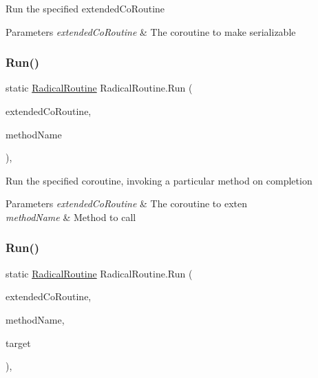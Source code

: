 Run the specified extended\+Co\+Routine 


\begin{DoxyParams}{Parameters}
{\em extended\+Co\+Routine} & The coroutine to make serializable \\
\hline
\end{DoxyParams}
\mbox{\label{class_radical_routine_ac64373a158f06b92f5d1c0052a49c3b6}} 
\subsubsection{\texorpdfstring{Run()}{Run()}\hspace{0.1cm}{\footnotesize\ttfamily [2/6]}}
{\footnotesize\ttfamily static \hyperlink{class_radical_routine}{Radical\+Routine} Radical\+Routine.\+Run (\begin{DoxyParamCaption}\item[{I\+Enumerator}]{extended\+Co\+Routine,  }\item[{string}]{method\+Name }\end{DoxyParamCaption})\hspace{0.3cm}{\ttfamily [inline]}, {\ttfamily [static]}}



Run the specified coroutine, invoking a particular method on completion 


\begin{DoxyParams}{Parameters}
{\em extended\+Co\+Routine} & The coroutine to exten \\
\hline
{\em method\+Name} & Method to call \\
\hline
\end{DoxyParams}
\mbox{\label{class_radical_routine_a569f25f7a79cec6bee8998d2927e1de2}} 
\subsubsection{\texorpdfstring{Run()}{Run()}\hspace{0.1cm}{\footnotesize\ttfamily [3/6]}}
{\footnotesize\ttfamily static \hyperlink{class_radical_routine}{Radical\+Routine} Radical\+Routine.\+Run (\begin{DoxyParamCaption}\item[{I\+Enumerator}]{extended\+Co\+Routine,  }\item[{string}]{method\+Name,  }\item[{object}]{target }\end{DoxyParamCaption})\hspace{0.3cm}{\ttfamily [inline]}, {\ttfamily [static]}}



